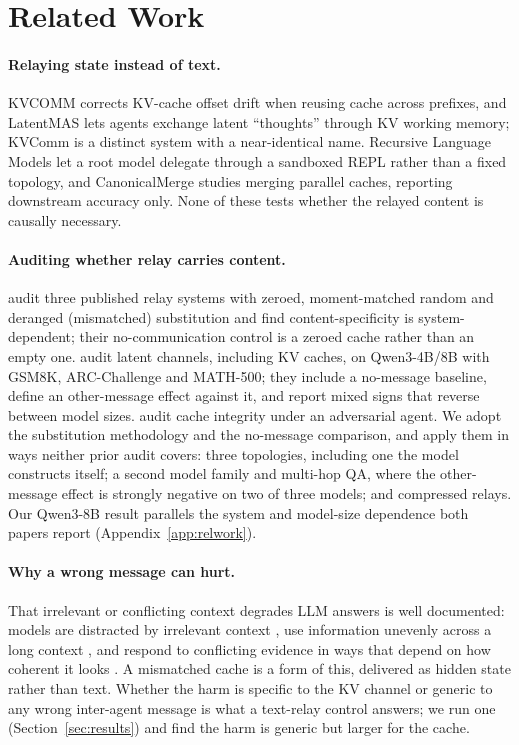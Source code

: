 \documentclass[11pt]{article}
\begin{document}
\section{Related Work}
\label{sec:related}

\paragraph{Relaying state instead of text.} KVCOMM \citep{kvcomm2025}
corrects KV-cache offset drift when reusing cache across prefixes, and
LatentMAS \citep{latentmas2026} lets agents exchange latent ``thoughts''
through KV working memory; KVComm \citep{shikvcomm2025} is a distinct
system with a near-identical name. Recursive Language Models
\citep{rlm2026} let a root model delegate through a sandboxed REPL
rather than a fixed topology, and CanonicalMerge
\citep{canonicalmerge2026} studies merging parallel caches, reporting
downstream accuracy only. None of these tests whether the relayed
content is causally necessary.

\paragraph{Auditing whether relay carries content.}
\citet{latentcommpay2026} audit three published relay systems with zeroed,
moment-matched random and deranged (mismatched) substitution and find
content-specificity is system-dependent; their no-communication control is a
zeroed cache rather than an empty one. \citet{zhangemu2026} audit latent
channels, including KV caches, on Qwen3-4B/8B with GSM8K, ARC-Challenge and
MATH-500; they include a no-message baseline, define an other-message effect
against it, and report mixed signs that reverse between model sizes.
\citet{latentagentslie2026} audit cache integrity under an adversarial agent.
We adopt the substitution methodology and the no-message comparison, and apply
them in ways neither prior audit covers: three topologies, including one the
model constructs itself; a second model family and multi-hop QA, where the
other-message effect is strongly negative on two of three models; and
compressed relays. Our Qwen3-8B result parallels the system and model-size
dependence both papers report (Appendix~\ref{app:relwork}).

\paragraph{Why a wrong message can hurt.} That irrelevant or conflicting
context degrades LLM answers is well documented: models are distracted by
irrelevant context \citep{shi2023distracted}, use information unevenly across a
long context \citep{liu2024lost}, and respond to conflicting evidence in ways
that depend on how coherent it looks \citep{xie2024knowledgeconflicts}. A
mismatched cache is a form of this, delivered as hidden state rather than
text. Whether the harm is specific to the KV channel or generic to any wrong
inter-agent message is what a text-relay control answers; we run one
(Section~\ref{sec:results}) and find the harm is generic but larger for the cache.
\end{document}
